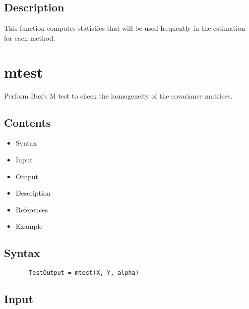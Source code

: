 \documentclass[a4paper,11pt,openany]{memoir}
\begin{document}
\subsection*{Description}

\begin{par}
This function computes statistics that will be used frequently in the estimation for each method.
\end{par} \vspace{1em}

\newpage

\section{mtest}

\begin{par}
Perform Box's M test to check the homogeneity of the covariance matrices.
\end{par} \vspace{1em}

\subsection*{Contents}

\begin{itemize}
\setlength{\itemsep}{-1ex}
   \item Syntax
   \item Input
   \item Output
   \item Description
   \item References
   \item Example
\end{itemize}


\subsection*{Syntax}


\begin{verbatim}       TestOutput = mtest(X, Y, alpha)\end{verbatim}
    

\subsection*{Input}
\end{document}

